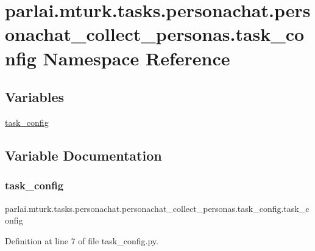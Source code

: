 \hypertarget{namespaceparlai_1_1mturk_1_1tasks_1_1personachat_1_1personachat__collect__personas_1_1task__config}{}\section{parlai.\+mturk.\+tasks.\+personachat.\+personachat\+\_\+collect\+\_\+personas.\+task\+\_\+config Namespace Reference}
\label{namespaceparlai_1_1mturk_1_1tasks_1_1personachat_1_1personachat__collect__personas_1_1task__config}
\subsection*{Variables}
\begin{DoxyCompactItemize}
\item 
\hyperlink{namespaceparlai_1_1mturk_1_1tasks_1_1personachat_1_1personachat__collect__personas_1_1task__config_a32d3b91e2424850f800032533b91e3cf}{task\+\_\+config}
\end{DoxyCompactItemize}


\subsection{Variable Documentation}
\mbox{\label{namespaceparlai_1_1mturk_1_1tasks_1_1personachat_1_1personachat__collect__personas_1_1task__config_a32d3b91e2424850f800032533b91e3cf}} 
\subsubsection{\texorpdfstring{task\+\_\+config}{task\_config}}
{\footnotesize\ttfamily parlai.\+mturk.\+tasks.\+personachat.\+personachat\+\_\+collect\+\_\+personas.\+task\+\_\+config.\+task\+\_\+config}



Definition at line 7 of file task\+\_\+config.\+py.

